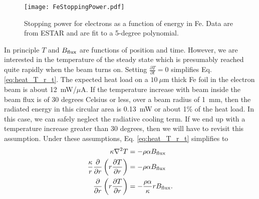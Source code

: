 \documentclass[12pt]{article}
\begin{document}
\begin{figure}[h]
\centering
\texttt{[image: FeStoppingPower.pdf]}
\caption{\label{fig:stopping}Stopping power for electrons as a function of energy in Fe. Data are from ESTAR and are fit to a 5-degree polynomial.}
\end{figure}
In principle $T$ and $B_{\rm flux}$ are functions of position and time. However, we are interested in the temperature of the steady state which is presumably reached quite rapidly when the beam turns on. Setting $\frac{\partial T}{\partial t}=0$ simplifies Eq. \ref{eq:heat_T_r_t}. The expected heat load on a $10~\mu$m thick Fe foil in the electron beam is about 12~mW/$\mu$A. If the temperature increase with beam inside the beam flux is of 30 degrees Celsius or less, over a beam radius of 1~mm, then the radiated energy in this circular area is 0.13~mW or about 1\% of the heat load. In this case, we can safely neglect the radiative cooling term. If we end up with a temperature increase greater than 30 degrees, then we will have to revisit this assumption. Under these assumptions, Eq. \ref{eq:heat_T_r_t} simplifies to  
\begin{align}
\kappa\nabla^2T&=-\rho\alpha B_{\rm flux}\\
\frac{\kappa}{r}\frac{\partial}{\partial r}\left(r\frac{\partial T}{\partial r}\right)&=-\rho\alpha B_{\rm flux}\\
\label{eq:heat_T_r}
\frac{\partial}{\partial r}\left(r\frac{\partial T}{\partial r}\right)&=-\frac{\rho\alpha}{\kappa}rB_{\rm flux}.
\end{align}
\end{document}
